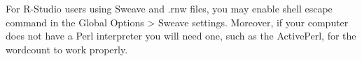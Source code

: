 \documentclass[draft]{trb_unofficial}
\begin{document}
For R-Studio users using Sweave and .rnw files, you may enable shell escape command in the Global Options > Sweave settings.  Moreover, if your computer does not have a Perl interpreter you will need one, such as the ActivePerl, for the wordcount to work properly.

\newpage




\nolinenumbers
\end{document}
